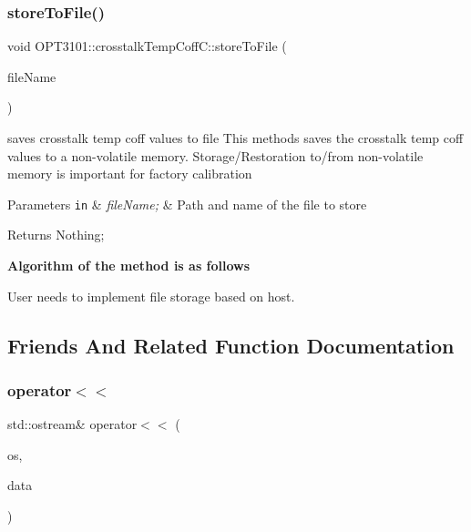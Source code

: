 \subsubsection{\texorpdfstring{store\+To\+File()}{storeToFile()}}
{\footnotesize\ttfamily void O\+P\+T3101\+::crosstalk\+Temp\+Coff\+C\+::store\+To\+File (\begin{DoxyParamCaption}\item[{char $\ast$}]{file\+Name }\end{DoxyParamCaption})}



saves crosstalk temp coff values to file This methods saves the crosstalk temp coff values to a non-\/volatile memory. Storage/\+Restoration to/from non-\/volatile memory is important for factory calibration 


\begin{DoxyParams}[1]{Parameters}
\mbox{\tt in}  & {\em file\+Name;} & Path and name of the file to store \\
\hline
\end{DoxyParams}
\begin{DoxyReturn}{Returns}
Nothing; 
\end{DoxyReturn}
{\bfseries Algorithm of the method is as follows}


\begin{DoxyItemize}
\item User needs to implement file storage based on host. 
\end{DoxyItemize}

\subsection{Friends And Related Function Documentation}
\mbox{\label{class_o_p_t3101_1_1crosstalk_temp_coff_c_a97fcdfa432cb48c20b2c436ff6f8d03e}} 
\subsubsection{\texorpdfstring{operator$<$$<$}{operator<<}}
{\footnotesize\ttfamily std\+::ostream\& operator$<$$<$ (\begin{DoxyParamCaption}\item[{std\+::ostream \&}]{os,  }\item[{const \mbox{\hyperlink{class_o_p_t3101_1_1crosstalk_temp_coff_c}{crosstalk\+Temp\+CoffC}} $\ast$}]{data }\end{DoxyParamCaption})\hspace{0.3cm}{\ttfamily [friend]}}



